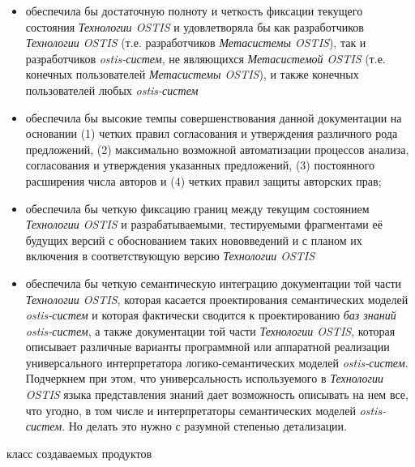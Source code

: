 \begin{scnsubstruct}
{        \begin{itemize}
            \item обеспечила бы достаточную полноту и четкость фиксации текущего состояния \textit{Технологии OSTIS} и удовлетворяла бы как разработчиков \textit{Технологии OSTIS} (т.е. разработчиков \textit{Метасистемы OSTIS}), так и разработчиков \textit{ostis-систем}, не являющихся \textit{Метасистемой OSTIS} (т.е. конечных пользователей \textit{Метасистемы OSTIS}), и также конечных пользователей любых \textit{ostis-систем}
            \item обеспечила бы высокие темпы совершенствования данной документации на основании (1) четких правил согласования и утверждения различного рода предложений, (2) максимально возможной автоматизации процессов анализа, согласования и утверждения указанных предложений, (3) постоянного расширения числа авторов и (4) четких правил защиты авторских прав;
            \item обеспечила бы четкую фиксацию границ между текущим состоянием \textit{Технологии OSTIS} и разрабатываемыми, тестируемыми фрагментами её будущих версий с обоснованием таких нововведений и с планом их включения в соответствующую версию \textit{Технологии OSTIS}
            \item обеспечила бы четкую семантическую интеграцию документации той части \textit{Технологии OSTIS}, которая касается проектирования семантических моделей \textit{ostis-систем} и которая фактически сводится к проектированию \textit{баз знаний ostis-систем}, а также документации той части \textit{Технологии OSTIS}, которая описывает различные варианты программной или аппаратной реализации универсального интерпретатора логико-семантических моделей \textit{ostis-систем}. Подчеркнем при этом, что универсальность используемого в \textit{Технологии OSTIS} языка представления знаний дает возможность описывать на нем все, что угодно, в том числе и интерпретаторы семантических моделей \textit{ostis-систем}. Но делать это нужно с разумной степенью детализации.
        \end{itemize}}
    \begin{scnrelfromlist}{класс создаваемых продуктов}
        \begin{scnindent}

\end{scnindent}
\end{scnrelfromlist}
\end{scnsubstruct}
